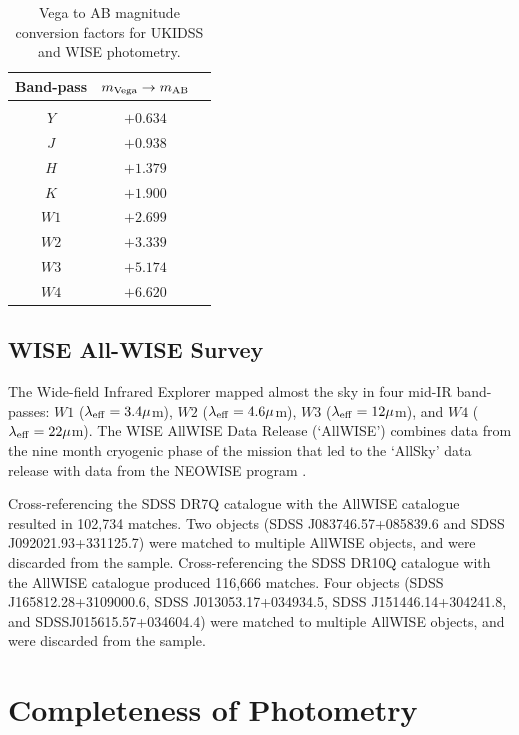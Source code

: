 \begin{table}
  \centering
  \begin{tabular}{c c c}
    \hline
    Band-pass & $m_{\rm Vega} \rightarrow m_{\rm AB}$ \\
    \hline \\
    $Y$ & $+0.634$ \\
    $J$ & $+0.938$ \\
    $H$ & $+1.379$ \\
    $K$ & $+1.900$ \\
    $W1$ & $+2.699$ \\
    $W2$ & $+3.339$ \\
    $W3$ & $+5.174$ \\
    $W4$ & $+6.620$ \\
    \hline
  \end{tabular}
  \caption{Vega to AB magnitude conversion factors for UKIDSS \citep{hewett06} and WISE \citep{cutri13} photometry.}
  \label{tab:magconversions}
\end{table}

\subsection{WISE All-WISE Survey}

The Wide-field Infrared Explorer \citep[WISE;][]{wright10} mapped almost the sky in four mid-IR band-passes: $W1$ ($\lambda_{\rm eff} = 3.4\mu$m), $W2$ ($\lambda_{\rm eff} = 4.6\mu$m), $W3$ ($\lambda_{\rm eff} = 12\mu$m), and $W4$ ($\lambda_{\rm eff} = 22\mu$m). The WISE AllWISE Data Release (`AllWISE') combines data from the nine month cryogenic phase of the mission that led to the `AllSky' data release with data from the NEOWISE program \citep{mainzer11}. 

Cross-referencing the SDSS DR7Q catalogue with the AllWISE catalogue resulted in 102,734 matches. Two objects (SDSS J083746.57+085839.6 and SDSS J092021.93+331125.7) were matched to multiple AllWISE objects, and were discarded from the sample. Cross-referencing the SDSS DR10Q catalogue with the AllWISE catalogue produced 116,666 matches. Four objects (SDSS J165812.28+3109000.6, SDSS J013053.17+034934.5, SDSS J151446.14+304241.8, and SDSSJ015615.57+034604.4) were matched to multiple AllWISE objects, and were discarded from the sample. 

\section{Completeness of Photometry}


